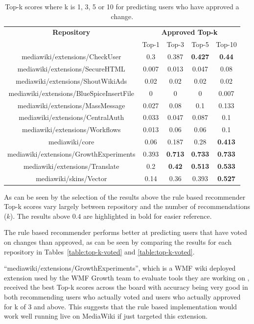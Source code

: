 \begin{table}[H]
\begin{center}
\hspace{0.25cm}
\begin{tabular}{@{}c c c c c@{}} 
 \hline
    \textbf{Repository} &
    \multicolumn{4}{c}{\textbf{Approved Top-k}} \\
      & {Top-1} & {Top-3} & {Top-5} & {Top-10} \\
      \hline
mediawiki/extensions/CheckUser & 0.3 & 0.387 & \textbf{0.427} & \textbf{0.44} \\
mediawiki/extensions/SecureHTML & 0.007 & 0.013 & 0.047 & 0.08 \\
mediawiki/extensions/ShoutWikiAds & 0.02 & 0.02 & 0.02 & 0.02 \\
mediawiki/extensions/BlueSpiceInsertFile & 0 & 0 & 0 & 0.007 \\
mediawiki/extensions/MassMessage & 0.027 & 0.08 & 0.1 & 0.133 \\
mediawiki/extensions/CentralAuth & 0.033 & 0.047 & 0.087 & 0.1 \\
mediawiki/extensions/Workflows & 0.013 & 0.06 & 0.06 & 0.1 \\
mediawiki/core & 0.06 & 0.187 & 0.28 & \textbf{0.413} \\
mediawiki/extensions/GrowthExperiments & 0.393 & \textbf{0.713} & \textbf{0.733} & \textbf{0.733} \\
mediawiki/extensions/Translate & 0.2 & \textbf{0.42} & \textbf{0.513} & \textbf{0.533} \\
mediawiki/skins/Vector & 0.14 & 0.36 & 0.393 & \textbf{0.527} \\
\hline
\end{tabular}
\end{center}
\caption{\label{table:top-k-approved}Top-k scores where k is 1, 3, 5 or 10 for predicting users who have approved a change.}
\end{table}

As can be seen by the selection of the results above the rule based recommender Top-k scores vary largely between repository and the number of recommendations (\(k\)). The results above \(0.4\) are highlighted in bold for easier reference.

The rule based recommender performs better at predicting users that have voted on changes than approved, as can be seen by comparing the results for each repository in Tables~\ref{table:top-k-voted} and \ref{table:top-k-voted}.

``mediawiki/extensions/GrowthExperiments'', which is a WMF wiki deployed extension used by the WMF Growth team to evaluate tools they are working on , received the best Top-k scores across the board with accuracy being very good in both recommending users who actually voted and users who actually approved for k of 3 and above. This suggests that the rule based implementation would work well running live on MediaWiki if just targeted this extension.

